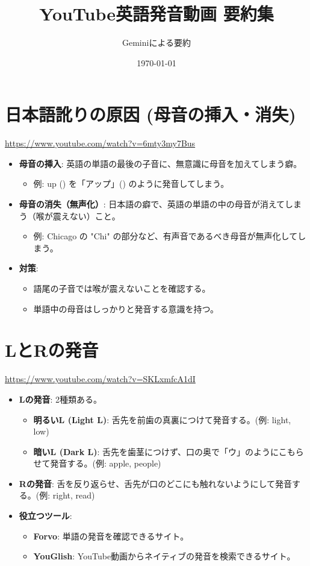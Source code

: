 \documentclass{jlreq}
\title{YouTube英語発音動画 要約集}
\author{Geminiによる要約}
\date{\today}
\begin{document}
\maketitle
\tableofcontents
\clearpage

\section{日本語訛りの原因 (母音の挿入・消失)}
\href{https://www.youtube.com/watch?v=6mty3my7Bus}{https://www.youtube.com/watch?v=6mty3my7Bus}
\begin{itemize}
    \item \textbf{母音の挿入}: 英語の単語の最後の子音に、無意識に母音を加えてしまう癖。
        \begin{itemize}
            \item 例: up (\textipa{[ʌp]}) を「アップ」(\textipa{[ʌpɯ]}) のように発音してしまう。
        \end{itemize}
    \item \textbf{母音の消失（無声化）}: 日本語の癖で、英語の単語の中の母音が消えてしまう（喉が震えない）こと。
        \begin{itemize}
            \item 例: Chicago の "Chi" の部分など、有声音であるべき母音が無声化してしまう。
        \end{itemize}
    \item \textbf{対策}:
    \begin{itemize}
        \item 語尾の子音では喉が震えないことを確認する。
        \item 単語中の母音はしっかりと発音する意識を持つ。
    \end{itemize}
\end{itemize}


\section{LとRの発音}
\href{https://www.youtube.com/watch?v=SKLxmfcA1dI}{https://www.youtube.com/watch?v=SKLxmfcA1dI}
\begin{itemize}
    \item \textbf{Lの発音}: 2種類ある。
    \begin{itemize}
        \item \textbf{明るいL (Light L)}: 舌先を前歯の真裏につけて発音する。(例: light, low)
        \item \textbf{暗いL (Dark L)}: 舌先を歯茎につけず、口の奥で「ウ」のようにこもらせて発音する。(例: apple, people)
    \end{itemize}
    \item \textbf{Rの発音}: 舌を反り返らせ、舌先が口のどこにも触れないようにして発音する。(例: right, read)
    \item \textbf{役立つツール}:
    \begin{itemize}
        \item \textbf{Forvo}: 単語の発音を確認できるサイト。
        \item \textbf{YouGlish}: YouTube動画からネイティブの発音を検索できるサイト。
    \end{itemize}
\end{itemize}
\end{document}
